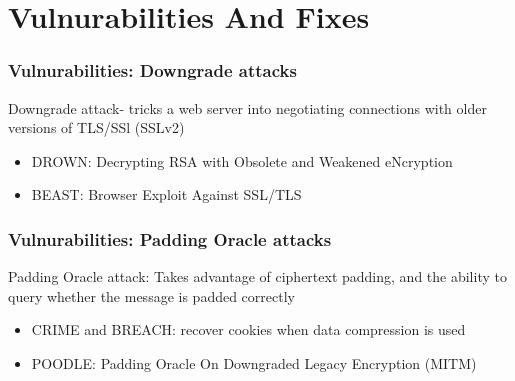 \documentclass{beamer}
\begin{document}
\section{Vulnurabilities And Fixes}

\begin{frame}
\frametitle{Vulnurabilities: Downgrade attacks}
Downgrade attack- tricks a web server into negotiating connections with older versions of TLS/SSl (SSLv2)
  \begin {itemize}
    \item DROWN: Decrypting RSA with Obsolete and Weakened eNcryption
    \item BEAST: Browser Exploit Against SSL/TLS
  \end{itemize}
\end{frame}

\begin{frame}
\frametitle{Vulnurabilities: Padding Oracle attacks}
Padding Oracle attack: Takes advantage of ciphertext padding, and the ability to query whether the message is padded correctly
  \begin {itemize}
    \item CRIME and BREACH: recover cookies when data compression is used
    \item POODLE: Padding Oracle On Downgraded Legacy Encryption (MITM)
  \end{itemize}
\end{frame}
\end{document}
